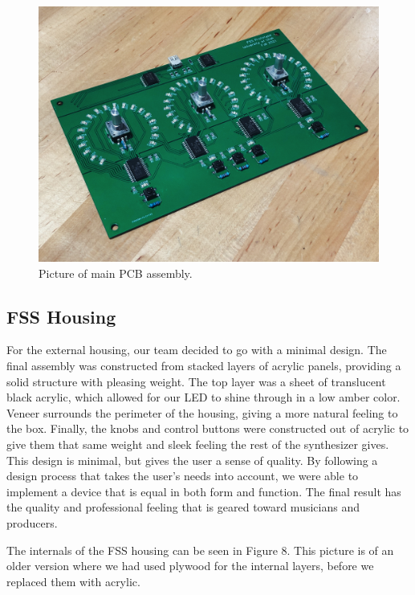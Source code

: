 \documentclass[conference]{IEEEtran}
\begin{document}
\begin{figure}[bhtp]
    \centering
    \includegraphics[width=5in]{./resources/figures/main_pcb_assembly.jpg}
    \caption{Picture of main PCB assembly.}
    \label{fig:main_pcb_assembly}
\end{figure}

\subsection{FSS Housing}
For the external housing, our team decided to go with a minimal design. The final assembly was constructed from stacked layers of acrylic panels, providing a solid structure with pleasing weight. The top layer was a sheet of translucent black acrylic, which allowed for our LED to shine through in a low amber color. Veneer surrounds the perimeter of the housing, giving a more natural feeling to the box. Finally, the knobs and control buttons were constructed out of acrylic to give them that same weight and sleek feeling the rest of the synthesizer gives. This design is minimal, but gives the user a sense of quality. By following a design process that takes the user's needs into account, we were able to implement a device that is equal in both form and function. The final result has the quality and professional feeling that is geared toward musicians and producers.

The internals of the FSS housing can be seen in Figure 8. This picture is of an older version where we had used plywood for the internal layers, before we replaced them with acrylic.
\end{document}
